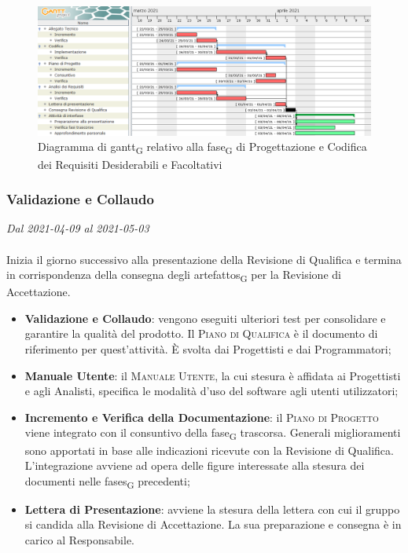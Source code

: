 \begin{figure}[H]
	\centering
	\includegraphics[scale=0.48]{res/images/05_gantt_codifica_desiderabili.png}
	\caption{Diagramma di \gls{gantt}\textsubscript{G} relativo alla \gls{fase}\textsubscript{G} di Progettazione e Codifica dei Requisiti Desiderabili e Facoltativi}
\end{figure}



\subsubsection{Validazione e Collaudo}

\textit{Dal 2021-04-09 al 2021-05-03}
\\\\
Inizia il giorno successivo alla presentazione della Revisione di Qualifica e termina in corrispondenza della consegna degli \glspl{artefatto}\textsubscript{G} per la Revisione di Accettazione.
\begin{itemize}
	\item \textbf{Validazione e Collaudo}: vengono eseguiti ulteriori test per consolidare e garantire la qualità del prodotto. Il \textsc{Piano di Qualifica} è il documento di riferimento per quest'attività. \`E svolta dai Progettisti e dai Programmatori;
	\item \textbf{Manuale Utente}: il \textsc{Manuale Utente}, la cui stesura è affidata ai Progettisti e agli Analisti, specifica le modalità d'uso del software agli utenti utilizzatori;
	\item \textbf{Incremento e Verifica della Documentazione}: il \textsc{Piano di Progetto} viene integrato con il consuntivo della \gls{fase}\textsubscript{G} trascorsa. Generali miglioramenti sono apportati in base alle indicazioni ricevute con la Revisione di Qualifica. L'integrazione avviene ad opera delle figure interessate alla stesura dei documenti nelle \glspl{fase}\textsubscript{G} precedenti;
	\item \textbf{Lettera di Presentazione}: avviene la stesura della lettera con cui il gruppo si candida alla Revisione di Accettazione. La sua preparazione e consegna è in carico al Responsabile.
\end{itemize}

